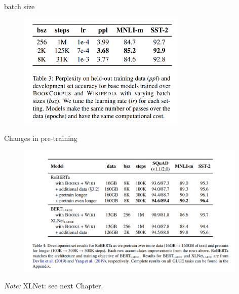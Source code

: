 
\begin{frame}{batch size}

\vfill

\begin{figure}
\centering
\includegraphics[width = 8cm]{figure/roberta-undertrained.png}\\ 
\end{figure}

\vfill

\end{frame}


\begin{frame}{Changes in pre-training}

\vfill

\begin{figure}
\centering
\includegraphics[width = 11cm]{figure/roberta-undertrained2.png}\\ 
\end{figure}

\vfill

\scriptsize
\textit{Note:} XLNet: see next Chapter.

\end{frame}

